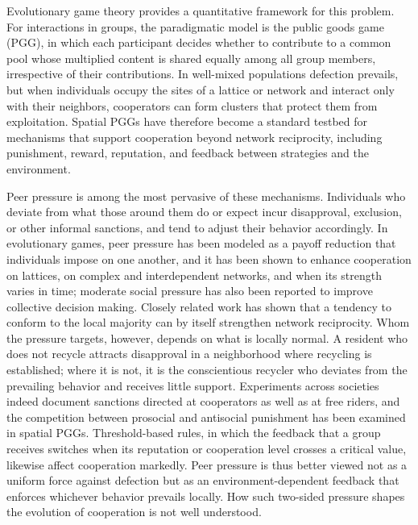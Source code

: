 \documentclass[%
  aip,cha,
  amsmath,amssymb,
  reprint,
  article-title,
]{revtex4-2}
\begin{document}
Evolutionary game theory provides a quantitative framework for this problem.\cite{smith1973logic,taylor1978evolutionary,nowak2006evolutionary}
For interactions in groups, the paradigmatic model is the public goods game (PGG), in which each participant decides whether to contribute to a common pool whose multiplied content is shared equally among all group members, irrespective of their contributions.\cite{hauert2006evolutionary,kurokawa2009emergence}
In well-mixed populations defection prevails, but when individuals occupy the sites of a lattice or network and interact only with their neighbors, cooperators can form clusters that protect them from exploitation.\cite{nowak1992evolutionary,ohtsuki2006simple,szabo2007evolutionary,szolnoki2009impact,perc2013evolutionary,perc2017statistical}
Spatial PGGs have therefore become a standard testbed for mechanisms that support cooperation beyond network reciprocity,\cite{perc2010coevolutionary,szolnoki2016competition,quan2018continuous,yang2018benefits} including punishment,\cite{fehr2002altruistic,chen2014probabilistic,szolnoki2017antisocial,xie2024regulation,zhao2024emergence} reward,\cite{rand2009positive,wang2023synergistic} reputation,\cite{milinski2002helps,santos2018social,ren2024interaction} and feedback between strategies and the environment.\cite{weitz2016oscillating,tilman2020evolutionary,wang2020eco}

Peer pressure is among the most pervasive of these mechanisms. Individuals who deviate from what those around them do or expect incur disapproval, exclusion, or other informal sanctions, and tend to adjust their behavior accordingly.\cite{asch1952social,kandel1992peer,mani2013inducing}
In evolutionary games, peer pressure has been modeled as a payoff reduction that individuals impose on one another, and it has been shown to enhance cooperation on lattices, on complex and interdependent networks, and when its strength varies in time;\cite{yang2015peer,deng2018peer,hu2021peer,gao2023impact,ma2025evolution} moderate social pressure has also been reported to improve collective decision making.\cite{xu2026synergistic}
Closely related work has shown that a tendency to conform to the local majority can by itself strengthen network reciprocity.\cite{szolnoki2015conformity}
Whom the pressure targets, however, depends on what is locally normal.\cite{cialdini1990focus}
A resident who does not recycle attracts disapproval in a neighborhood where recycling is established; where it is not, it is the conscientious recycler who deviates from the prevailing behavior and receives little support.
Experiments across societies indeed document sanctions directed at cooperators as well as at free riders,\cite{herrmann2008antisocial} and the competition between prosocial and antisocial punishment has been examined in spatial PGGs.\cite{szolnoki2017antisocial}
Threshold-based rules, in which the feedback that a group receives switches when its reputation or cooperation level crosses a critical value, likewise affect cooperation markedly.\cite{zhu2024synergy,hu2025dynamic}
Peer pressure is thus better viewed not as a uniform force against defection but as an environment-dependent feedback that enforces whichever behavior prevails locally. How such two-sided pressure shapes the evolution of cooperation is not well understood.
\end{document}
